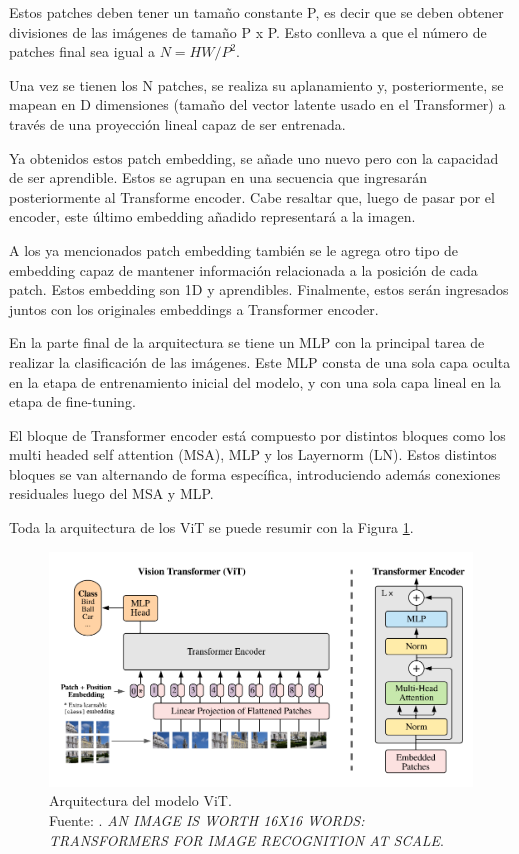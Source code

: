 Estos patches deben tener un tamaño constante P, es decir que se deben obtener divisiones de las imágenes de tamaño P x P. Esto conlleva a que el número de patches final sea igual a $N = HW / P^2$.

Una vez se tienen los N patches, se realiza su aplanamiento y, posteriormente, se mapean en D dimensiones (tamaño del vector latente usado en el Transformer) a través de una proyección lineal capaz de ser entrenada.

Ya obtenidos estos patch embedding, se añade uno nuevo pero con la capacidad de ser aprendible. Estos se agrupan en una secuencia que ingresarán posteriormente al Transforme encoder. Cabe resaltar que, luego de pasar por el encoder, este último embedding añadido representará a la imagen.

A los ya mencionados patch embedding también se le agrega otro tipo de embedding capaz de mantener información relacionada a la posición de cada patch. Estos embedding son 1D y aprendibles. Finalmente, estos serán ingresados juntos con los originales embeddings a Transformer encoder.

En la parte final de la arquitectura se tiene un MLP con la principal tarea de realizar la clasificación de las imágenes. Este MLP consta de una sola capa oculta en la etapa de entrenamiento inicial del modelo, y con una sola capa lineal en la etapa de fine-tuning.

El bloque de Transformer encoder está compuesto por distintos bloques como los multi headed self attention (MSA), MLP y los Layernorm (LN). Estos distintos bloques se van alternando de forma específica, introduciendo además conexiones residuales luego del MSA y MLP.

Toda la arquitectura de los ViT se puede resumir con la Figura \ref{2:fig206}.

\begin{figure}[H]
	\begin{center}
		\includegraphics[width=1.00\textwidth]{2/figures/vit_arquitecture.png}
		\caption[Arquitectura del modelo ViT]{Arquitectura del modelo ViT. \\
		Fuente: \cite{pr_dosovitskiy2021animageisworth}. \textit{AN IMAGE IS WORTH 16X16 WORDS: TRANSFORMERS FOR IMAGE RECOGNITION AT SCALE}.}
		\label{2:fig206}
	\end{center}
\end{figure}


